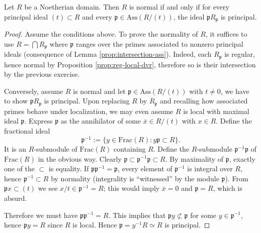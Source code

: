 \begin{proposition}\label{prop:normality-principal}
	Let $R$ be a Noetherian domain. Then $R$ is normal if and only if for every principal ideal $(t) \subset R$ and every $\mathfrak{p} \in \mathrm{Ass}(R/(t))$, the ideal $\mathfrak{p}R_{\mathfrak{p}}$ is principal.
\end{proposition}
\begin{proof}
	Assume the conditions above. To prove the normality of $R$, it suffices to use $R = \bigcap R_{\mathfrak{p}}$ where $\mathfrak{p}$ ranges over the primes associated to nonzero principal ideals (consequence of Lemma \ref{prop:intersection-ass}). Indeed, each $R_{\mathfrak{p}}$ is regular, hence normal by Proposition \ref{prop:reg-local-dvr}, therefore so is their intersection by the previous exercise.
	
	Conversely, assume $R$ is normal and let $\mathfrak{p} \in \text{Ass}(R/(t))$ with $t \neq 0$, we have to show $\mathfrak{p}R_{\mathfrak{p}}$ is principal. Upon replacing $R$ by $R_{\mathfrak{p}}$ and recalling how associated primes behave under localization, we may even assume $R$ is local with maximal ideal $\mathfrak{p}$. Express $\mathfrak{p}$ as the annihilator of some $\bar{x} \in R/(t)$ with $x \in R$. Define the fractional ideal
	\[ \mathfrak{p}^{-1} := \{ y \in \text{Frac}(R) : y\mathfrak{p} \subset R \}. \]
	It is an $R$-submodule of $\text{Frac}(R)$ containing $R$. Define the $R$-submodule $\mathfrak{p}^{-1}\mathfrak{p}$ of $\text{Frac}(R)$ in the obvious way. Clearly $\mathfrak{p} \subset \mathfrak{p}^{-1}\mathfrak{p} \subset R$. By maximality of $\mathfrak{p}$, exactly one of the $\subset$ is equality. If $\mathfrak{p}\mathfrak{p}^{-1}=\mathfrak{p}$, every element of $\mathfrak{p}^{-1}$ is integral over $R$, hence $\mathfrak{p}^{-1} \subset R$ by normality (integrality is ``witnessed'' by the module $\mathfrak{p}$). From $\mathfrak{p}x \subset (t)$ we see $x/t \in \mathfrak{p}^{-1} = R$; this would imply $\bar{x} = 0$ and $\mathfrak{p}=R$, which is absurd.
	
	Therefore we must have $\mathfrak{p}\mathfrak{p}^{-1} = R$. This implies that $\mathfrak{p}y \not\subset \mathfrak{p}$ for some $y \in \mathfrak{p}^{-1}$, hence $\mathfrak{p}y = R$ since $R$ is local. Hence $\mathfrak{p} = y^{-1}R \simeq R$ is principal.
\end{proof}

